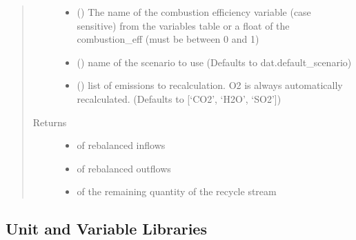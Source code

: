 \documentclass[a4paper,10pt,english]{sphinxmanual}
\begin{document}
\begin{fulllineitems}
\begin{quote}
\begin{description}
\begin{itemize}
\item {} 
\sphinxstyleliteralstrong{\sphinxupquote{{[}}}\sphinxstyleliteralstrong{\sphinxupquote{{]}}} () \textendash{} The name of the combustion efficiency variable (case sensitive) from the variables table
or a float of the combustion\_eff (must be between 0 and 1)

\item {} 
 () \textendash{} name of the scenario to use
(Defaults to dat.default\_scenario)

\item {} 
 (\sphinxstyleliteralemphasis{\sphinxupquote{{[}}}\sphinxstyleliteralemphasis{\sphinxupquote{{]}}}) \textendash{} list of emissions to recalculation. O2 is always automatically recalculated.
(Defaults to {[}‘CO2’, ‘H2O’, ‘SO2’{]})

\end{itemize}

\item[{Returns}] \leavevmode
\begin{itemize}
\item {} 
 of rebalanced inflows

\item {} 
 of rebalanced outflows

\item {} 
 of the remaining quantity of the recycle stream

\end{itemize}


\end{description}\end{quote}

\end{fulllineitems}



\subsection{Unit and Variable Libraries}
\label{\detokenize{unit:unit-and-variable-libraries}}
\end{document}
